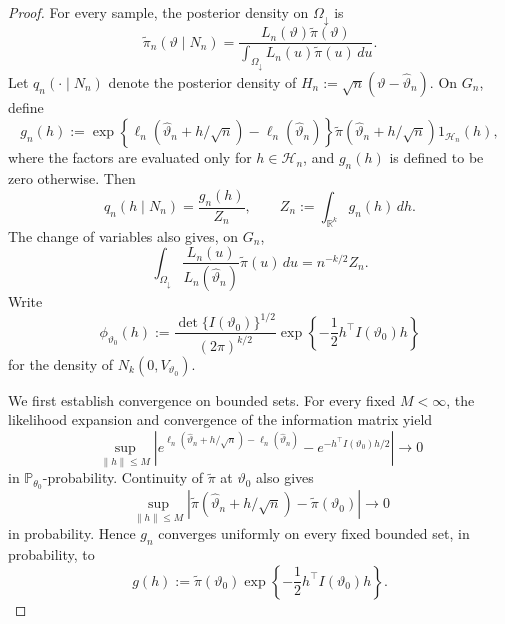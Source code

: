 \documentclass{article}
\theoremstyle{named}
\theoremstyle{named1}
\theoremstyle{plain}
\theoremstyle{remark}
\begin{document}
\begin{proof}
For every sample, the posterior density on $\Omega_{\downarrow}$ is
\[
    \widetilde\pi_n(\vartheta\mid N_n)
    =
    \frac{L_n(\vartheta)\widetilde\pi(\vartheta)}{
        \displaystyle\int_{\Omega_{\downarrow}}
        L_n(u)\widetilde\pi(u)\,du}.
\]
Let $q_n(\cdot\mid N_n)$ denote the posterior density of
$H_n:=\sqrt n(\vartheta-\widehat\vartheta_n)$. On $G_n$, define
\[
    g_n(h)
    :=
    \exp\left\{
        \ell_n(\widehat\vartheta_n+h/\sqrt n)
        -\ell_n(\widehat\vartheta_n)
    \right\}
    \widetilde\pi(\widehat\vartheta_n+h/\sqrt n)
    1_{\mathcal H_n}(h),
\]
where the factors are evaluated only for $h\in\mathcal H_n$, and
$g_n(h)$ is defined to be zero otherwise. Then
\[
    q_n(h\mid N_n)=\frac{g_n(h)}{Z_n},
    \qquad
    Z_n:=\int_{\mathbb R^k}g_n(h)\,dh.
\]
The change of variables also gives, on $G_n$,
\begin{equation}
    \int_{\Omega_{\downarrow}}
    \frac{L_n(u)}{L_n(\widehat\vartheta_n)}
    \widetilde\pi(u)\,du
    =n^{-k/2}Z_n.
    \label{eq:intrinsic-posterior-normalizer}
\end{equation}
Write
\[
    \phi_{\vartheta_0}(h)
    :=
    \frac{\det\{I(\vartheta_0)\}^{1/2}}{(2\pi)^{k/2}}
    \exp\left\{-\frac12h^\top I(\vartheta_0)h\right\}
\]
for the density of $N_k(0,V_{\vartheta_0})$.

We first establish convergence on bounded sets. For every fixed
$M<\infty$, the likelihood expansion and convergence of the information
matrix yield
\begin{equation}
    \sup_{\|h\|\leq M}
    \left|
        e^{\ell_n(\widehat\vartheta_n+h/\sqrt n)
             -\ell_n(\widehat\vartheta_n)}
        -e^{-h^\top I(\vartheta_0)h/2}
    \right|
    \rightarrow0
    \label{local_expansion_exp}
\end{equation}
in $\mathbb P_{\theta_0}$-probability. Continuity of
$\widetilde\pi$ at $\vartheta_0$ also gives
\[
    \sup_{\|h\|\leq M}
    \left|
        \widetilde\pi(\widehat\vartheta_n+h/\sqrt n)
        -\widetilde\pi(\vartheta_0)
    \right|
    \rightarrow0
\]
in probability. Hence $g_n$ converges uniformly on every fixed bounded
set, in probability, to
\begin{equation}
    g(h):=\widetilde\pi(\vartheta_0)
    \exp\left\{-\frac12h^\top I(\vartheta_0)h\right\}.
    \label{eq:local-density-limit}
\end{equation}


\end{proof}
\end{document}
